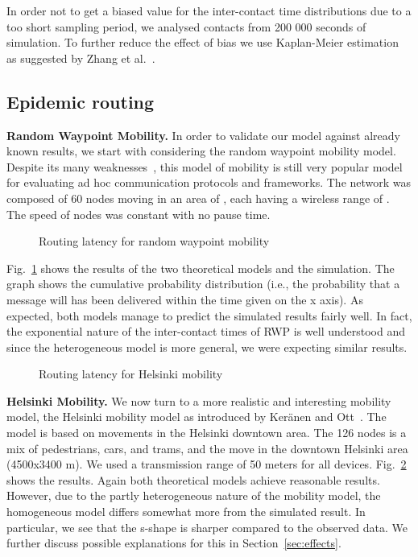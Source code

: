 \documentclass{article}
\begin{document}
In order not to get a biased value for the inter-contact time distributions
due to a too short sampling period, we analysed contacts from 200 000
seconds of simulation. To further reduce the effect of bias we use
Kaplan-Meier estimation as suggested by Zhang et
al.~\cite{zhang07}. 

\subsection{Epidemic routing}

{\bf Random Waypoint Mobility.} In order to validate our model against
already known results, we start with considering the random waypoint
mobility model. Despite its many
weaknesses~\cite{aschenbruck10,yoon03}, this model of mobility is
still very popular model for evaluating ad hoc communication protocols
and frameworks.  The network was composed of 60 nodes moving in an
area of , each having a wireless range of . The
speed of nodes was constant  with no pause time.

\begin{figure}[htb]
  \centering
   \caption{Routing latency for random waypoint mobility}
  \label{fig:rwp}
\end{figure}


Fig.~\ref{fig:rwp} shows the results of the two theoretical models
and the simulation. The graph shows the cumulative probability
distribution (i.e., the probability that a message will has been
delivered within the time given on the x axis). As expected, both
models manage to predict the simulated results fairly well. In fact,
the exponential nature of the inter-contact times of RWP is well
understood and since the heterogeneous model is more general, we were
expecting similar results.

\begin{figure}[htb]
  \centering
   \caption{Routing latency for Helsinki mobility}
  \label{fig:helsinki}
\end{figure}

{\bf Helsinki Mobility.} We now turn to a more realistic and
interesting mobility model, the Helsinki mobility model as introduced
by Ker{\"a}nen and Ott~\cite{keraenen07increasing}. The model is based
on movements in the Helsinki downtown area. The 126 nodes is a mix of
pedestrians, cars, and trams, and the move in the downtown Helsinki
area (4500x3400 m). We used a transmission range of 50 meters for all
devices.  Fig.~\ref{fig:helsinki} shows the results. Again both
theoretical models achieve reasonable results. However, due to the
partly heterogeneous nature of the mobility model, the homogeneous
model differs somewhat more from the simulated result. In particular,
we see that the s-shape is sharper compared to the observed
data. We further discuss possible explanations for this in
Section~\ref{sec:effects}.
\end{document}
